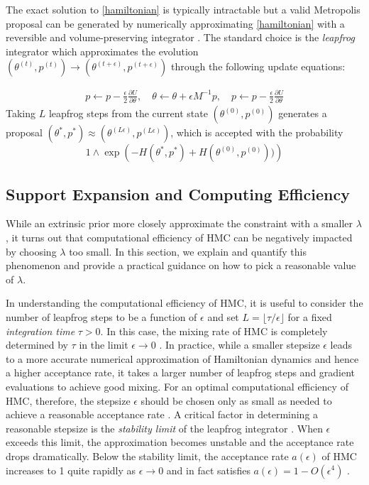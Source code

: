 \documentclass[10pt]{article}
\DeclareMathOperator{\1}{\mathbbm{1}}
\newcommand{\dt}{\epsilon} %
\newcommand{\mass}{M} %
\begin{document}
The exact solution to \eqref{hamiltonian} is typically intractable but a valid Metropolis proposal can be generated by numerically approximating \eqref{hamiltonian} with a reversible and volume-preserving  integrator \citep{neal2011mcmc}. The standard choice is the \textit{leapfrog} integrator which approximates the evolution $(\theta^{(t)},p^{(t)}) \to (\theta^{(t + \dt)},p^{(t + \dt)})$ through the following update equations:

\begin{equation}
\begin{aligned}
\label{leap-frog}
p \leftarrow p - \frac{\dt}{2} \frac{\partial U}{\partial  \theta },\quad
\theta \leftarrow  \theta  + \dt \mass^{-1}p,\quad
p \leftarrow p -  \frac{\dt}{2}  \frac{\partial U}{\partial  \theta } 
\end{aligned}
\end{equation}
Taking $L$ leapfrog steps from the current state $(\theta^{(0)},p^{(0)})$ generates a proposal $(\theta^{*},p^{*}) \approx (\theta^{(L \dt)},p^{(L \dt)})$, which is accepted with the probability 
$$1\wedge \exp  \left( - H(\theta^{*},p^{*}) + H(\theta^{(0)},p^{(0)}))\right)$$


\subsection{Support Expansion and Computing Efficiency}

While an extrinsic prior more closely approximate the constraint with a smaller $\lambda$, it turns out that computational efficiency of HMC can be negatively impacted by choosing $\lambda$ too small. In this section, we explain and quantify this phenomenon and provide a practical guidance on how to pick a reasonable value of $\lambda$.

In understanding the computational efficiency of HMC, it is useful to consider the number of leapfrog steps to be a function of $\dt$ and set $L = \lfloor \tau / \dt \rfloor$ for a fixed \textit{integration time} $\tau > 0$. In this case, the mixing rate of HMC is completely determined by $\tau$ in the limit $\dt \to 0$ \citep{betancourt17}. In practice, while a smaller stepsize $\dt$ leads to a more accurate numerical approximation of Hamiltonian dynamics and hence a higher acceptance rate, it takes a larger number of leapfrog steps and gradient evaluations to achieve good mixing. For an optimal computational efficiency of HMC, therefore, the stepsize $\dt$ should be chosen only as small as needed to achieve a reasonable acceptance rate \citep{beskos13, betancourt14}. A critical factor in determining a reasonable stepsize is the \textit{stability limit} of the leapfrog integrator \citep{neal2011mcmc}. When $\dt$ exceeds this limit, the approximation becomes unstable and the acceptance rate drops dramatically. Below the stability limit, the acceptance rate $a(\dt)$ of HMC increases to 1 quite rapidly as $\dt \to 0$ and in fact satisfies $a(\dt) = 1 - O(\dt^4)$ \citep{beskos13}.
\end{document}
